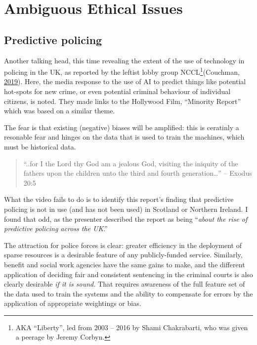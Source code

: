 \documentclass[
]{book}
\begin{document}
\hypertarget{ambiguous-ethical-issues}{%
\section{Ambiguous Ethical Issues}\label{ambiguous-ethical-issues}}

\hypertarget{predictive-policing}{%
\subsection{Predictive policing}\label{predictive-policing}}

Another talking head, this time revealing the extent of the use of technology in policing in the UK, as reported by the leftist lobby group NCCL\footnote{AKA ``Liberty'', led from 2003 -- 2016 by Shami Chakrabarti, who was given a peerage by Jeremy Corbyn.}(Couchman, \protect\hyperlink{ref-Couchman2019}{2019}). Here, the media response to the use of AI to predict things like potential hot-spots for new crime, or even potential criminal behaviour of individual citizens, is noted. They made links to the Hollywood Film, ``Minority Report'' which was based on a similar theme.

The fear is that existing (negative) biases will be amplified: this is ceratinly a resonable fear and hinges on the data that is used to train the machines, which must be historical data.

\begin{quote}
``..for I the Lord thy God am a jealous God, visiting the iniquity of the fathers upon the children unto the third and fourth generation\ldots{}'' -- Exodus 20:5
\end{quote}

What the video fails to do is to identify this report's finding that predictive policing is not in use (and has not been used) in Scotland or Northern Ireland. I found that odd, as the presenter described the report as being ``\emph{about the rise of predictive policing across the UK}.''

The attraction for police forces is clear: greater efficiency in the deployment of sparse resources is a desirable feature of any publicly-funded service. Similarly, benefit and social work agencies have the same gains to make, and the different application of deciding fair and consistent sentencing in the criminal courts is also clearly desirable \emph{if it is sound.} That requires awareness of the full feature set of the data used to train the systems and the ability to compensate for errors by the application of appropriate weightings or bias.
\end{document}
